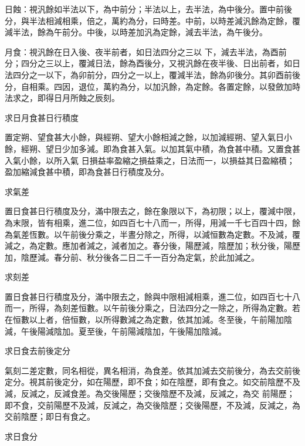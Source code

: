 \begin{pinyinscope}
 日蝕：視汎餘如半法以下，為中前分；半法以上，去半法，為中後分。置中前後分，與半法相減相乘，倍之，萬約為分，曰時差。中前，以時差減汎餘為定餘，覆減半法，餘為午前分。中後，以時差加汎為定餘，減去半法，為午後分。



 月食：視汎餘在日入後、夜半前者，如日法四分之三以
 下，減去半法，為酉前分；四分之三以上，覆減日法，餘為酉後分，又視汎餘在夜半後、日出前者，如日法四分之一以下，為卯前分，四分之一以上，覆減半法，餘為卯後分。其卯酉前後分，自相乘。四因，退位，萬約為分，以加汎餘，為定餘。各置定餘，以發斂加時法求之，即得日月所蝕之辰刻。



 求日月食甚日行積度



 置定朔、望食甚大小餘，與經朔、望大小餘相減之餘，以加減經朔、望入氣日小餘，經朔、望日少加多減。即為食甚入氣。以加其氣中積，為食甚中積。又置食甚入氣小餘，以所入氣
 日損益率盈縮之損益乘之，日法而一，以損益其日盈縮積；盈加縮減食甚中積，即為食甚日行積度及分。



 求氣差



 置日食甚日行積度及分，滿中限去之，餘在象限以下，為初限；以上，覆減中限，為末限，皆有相乘，進二位，如四百七十八而一，所得，用減一千七百四十四，餘為氣差恆數。以午前後分乘之，半晝分除之，所得，以減恒數為定數。不及減，覆減之，為定數。應加者減之，減者加之。春分後，陽歷減，陰歷加；秋分後，陽歷加，陰歷減。春分前、秋分後各二日二千一百分為定氣，於此加減之。



 求刻差



 置日食甚日行積度及分，滿中限去之，餘與中限相減相乘，進二位，如四百七十八而一，所得，為刻差恒數。以午前後分乘之，日法四分之一除之，所得為定數。若在恒數以上者，倍恒數，以所得數減之為定數，依其加減。冬至後，午前陽加陰減，午後陽減陰加。夏至後，午前陽減陰加，午後陽加陰減。



 求日食去前後定分



 氣刻二差定數，同名相從，異名相消，為食差。依其加減去交前後分，為去交前後定分。視其前後定分，如在陽歷，即不食；如在陰歷，即有食之。如交前陰歷不及減，反減之，反減食差。為交後陽歷；交後陰歷不及減，反減之，為交
 前陽歷；即不食，交前陽歷不及減，反減之，為交後陰歷；交後陽歷，不及減，反減之，為交前陰歷；即日有食之。



 求日食分




\end{pinyinscope}
